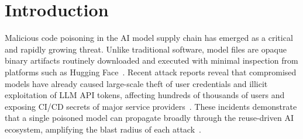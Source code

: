 \section{Introduction}
\label{sec:intro}


Malicious code poisoning in the AI model supply chain has emerged as a critical and rapidly growing threat. Unlike traditional software, model files are opaque binary artifacts routinely downloaded and executed with minimal inspection from platforms such as Hugging Face~\cite{huggingface}. Recent attack reports reveal that compromised models have already caused large-scale theft of user credentials and illicit exploitation of LLM API tokens, affecting hundreds of thousands of users and exposing CI/CD secrets of major service providers~\cite{litellm1,litellm2,litellm3}. These incidents demonstrate that a single poisoned model can propagate broadly through the reuse-driven AI ecosystem, amplifying the blast radius of each attack~\cite{models_are_codes}.

